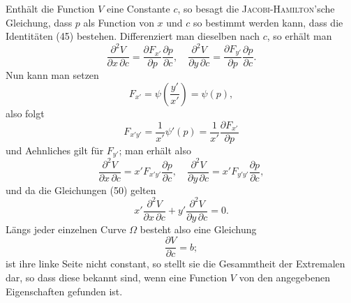 \documentclass[11pt,a4paper,leqno]{article}
\begin{document}
Enthält die Function $V$ eine Constante $c$, so besagt die \textsc{Jacobi-Hamilton}'sche Gleichung, dass $p$ als Function von $x$ und $c$ so bestimmt werden kann, dass die Identitäten (45) bestehen. Differenziert man dieselben nach $c$, so erhält man
\[
\frac{\partial^2 V}{\partial x\,\partial c}
=
\frac{\partial F_{x'}}{\partial p}\frac{\partial p}{\partial c},\quad
\frac{\partial^2 V}{\partial y\,\partial c}
=
\frac{\partial F_{y'}}{\partial p}\frac{\partial p}{\partial c}.
\]
Nun kann man setzen
\[
F_{x'}=\psi\left(\frac{y'}{x'}\right)=\psi(p),
\]
also folgt
\[
F_{x'y'}=\frac{1}{x'}\psi'(p)=\frac{1}{x'}\frac{\partial F_{x'}}{\partial p}
\]
und Aehnliches gilt für $F_{y'}$; man erhält also
\[
\frac{\partial^2 V}{\partial x\,\partial c}
=
x'F_{x'y'}\frac{\partial p}{\partial c},\quad
\frac{\partial^2 V}{\partial y\,\partial c}
=
x'F_{y'y'}\frac{\partial p}{\partial c},
\]
und da die Gleichungen (50) gelten
\[
x'\frac{\partial^2V}{\partial x\,\partial c}
+
y'\frac{\partial^2V}{\partial y\,\partial c}=0.
\]
Längs jeder einzelnen Curve $\Omega$ besteht also eine Gleichung
\[
\frac{\partial V}{\partial c}=b;
\]
ist ihre linke Seite nicht constant, so stellt sie die Gesammtheit der Extremalen dar, so dass diese bekannt sind, wenn eine Function $V$ von den angegebenen Eigenschaften gefunden ist.
\end{document}
